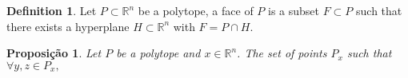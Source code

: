 \documentclass[]{article}
\newtheorem{proposition}{Proposição}[section]
\theoremstyle{definition}
\newtheorem{definition}{Definition}[section]
\theoremstyle{definition}
\newcommand{\bb}{\mathbb}
\begin{document}
\begin{definition}
	Let $P \subset \bb{R}^n$ be a polytope, a face of $P$ is a subset $F \subset P$ such that there exists a hyperplane $H \subset \bb{R}^n$ with $F = P \cap H$.
\end{definition}

\begin{proposition}
	 Let $P$ be a polytope and $x \in \bb{R}^n$. The set of points $P_x$ such that $\forall y, z \in P_x, $
	  
\end{proposition}
\end{document}
